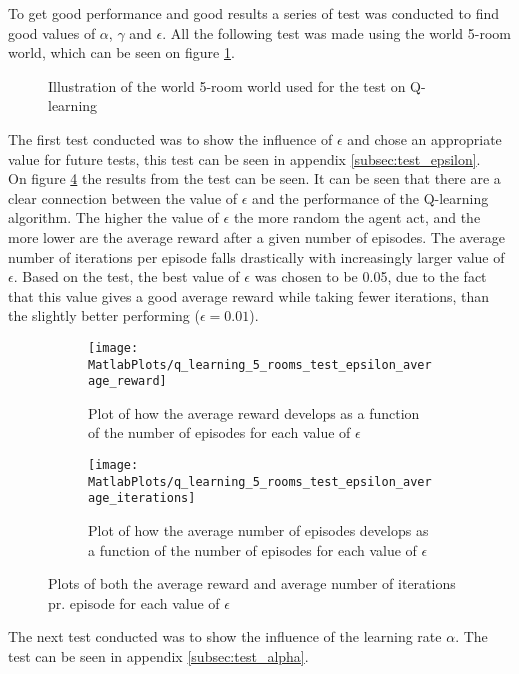 \documentclass[../Head/Main.tex]{subfiles}
\begin{document}
To get good performance and good results a series of test was conducted to find good values of $\alpha$, $\gamma$ and $\epsilon$. All the following test was made using the world 5-room world, which can be seen on figure \ref{fig:5-room_world_impl}.
\begin{figure}[H]
	\centering
	
	\caption{Illustration of the world 5-room world used for the test on Q-learning}
	\label{fig:5-room_world_impl}
\end{figure}
The first test conducted was to show the influence of $\epsilon$ and chose an appropriate value for future tests, this test can be seen in appendix \ref{subsec:test_epsilon}.\\
On figure \ref{fig:q-learn_epsilon_impl} the results from the test can be seen. It can be seen that there are a clear connection between the value of $\epsilon$ and the performance of the Q-learning algorithm. The higher the value of $\epsilon$ the more random the agent act, and the more lower are the average reward after a given number of episodes. The average number of iterations per episode falls drastically with increasingly larger value of $\epsilon$. Based on the test, the best value of $\epsilon$ was chosen to be 0.05, due to the fact that this value gives a good average reward while taking fewer iterations, than the slightly better performing ($\epsilon=0.01$). 
\begin{figure}[H]
	\centering
	\begin{subfigure}[b]{0.49\textwidth}
		\centering
		\texttt{[image: MatlabPlots/q\_learning\_5\_rooms\_test\_epsilon\_average\_reward]}
		\caption{Plot of how the average reward develops as a function of the number of episodes for each value of $\epsilon$}
		\label{fig:q-learn_epsilon_reward_impl}
	\end{subfigure}
	\hfill
	\begin{subfigure}[b]{0.49\textwidth}
		\centering
		\texttt{[image: MatlabPlots/q\_learning\_5\_rooms\_test\_epsilon\_average\_iterations]}
		\caption{Plot of how the average number of episodes develops as a function of the number of episodes for each value of $\epsilon$}
		\label{fig:q-learn_epsilon_iterations_impl}
	\end{subfigure}
	\caption{Plots of both the average reward and average number of iterations pr. episode for each value of $\epsilon$}
	\label{fig:q-learn_epsilon_impl}
\end{figure}
The next test conducted was to show the influence of the learning rate $\alpha$. The test can be seen in appendix \ref{subsec:test_alpha}.\\
\end{document}
